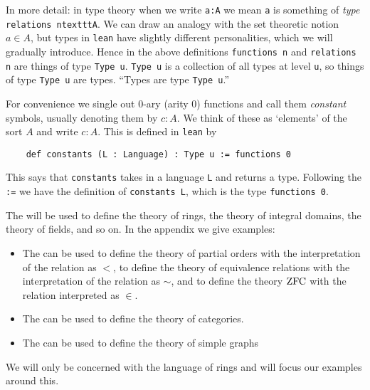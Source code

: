 \begin{dfn}[Language]
  In more detail: in type theory when we write \texttt{a:A} we mean \texttt{a} is something
  of \textit{type} \texttt{relations ntexttt{A}}.
  We can draw an analogy with the set theoretic notion $a \in A$,
  but types in \texttt{lean} have slightly different
  personalities, which we will gradually introduce.
  Hence in the above definitions \texttt{functions n} and \texttt{relations n}
  are things of type \texttt{Type u}.
  \texttt{Type u} is a collection of all types at level \texttt{u},
  so things of type \texttt{Type u} are types.
  ``Types are type \texttt{Type u}.''

  For convenience we single out $0$-ary (arity $0$) functions and
  call them \textit{constant} symbols, usually denoting them by $c : A$.
  We think of these as `elements' of the sort $A$ and write $c : A$.
  This is defined in \texttt{lean} by

  \begin{lstlisting}
    def constants (L : Language) : Type u := functions 0\end{lstlisting}

  This says that \texttt{constants} takes in a language \texttt{L} and returns a type.
  Following the \texttt{:=} we have the definition of \texttt{constants L},
  which is the type \texttt{functions 0}.
\end{dfn}

\begin{eg}
  The 
  will be used to define the theory of rings,
  the theory of integral domains, the theory of fields, and so on.
  In the appendix we give examples:
  \begin{itemize}
    \item The  %
          can be used to define the theory of partial orders
          with the interpretation of the relation as $<$,
          to define the theory of equivalence relations with the
          interpretation of the relation as $\sim$,
          and to define the theory $\operatorname{ZFC}$ with the relation interpreted as $\in$.
    \item The  %
          can be used to define the theory of categories.
    \item The 
          can be used to define the theory of simple graphs
  \end{itemize}
  We will only be concerned with the language of rings and will
  focus our examples around this.
\end{eg}


